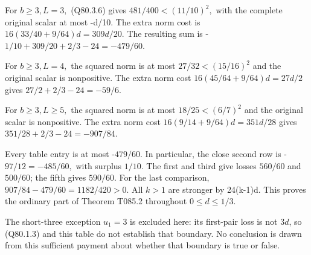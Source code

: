For \(b\ge 3,\allowbreak  L=3,\allowbreak \) (Q80.3.6) gives \(481/400<(11/10)^2,\allowbreak \) with the complete
original scalar at most -d/10. The extra norm cost is
\(16(33/40+9/64)d=309d/20.\) The resulting sum is
-\(1/10+309/20+2/3-24=-479/60.\)

For \(b\ge 3,\allowbreak  L=4,\allowbreak \) the squared norm is at most \(27/32<(15/16)^2\)
and the original scalar is nonpositive. The extra norm cost
\(16(45/64+9/64)d=27d/2\) gives \(27/2+2/3-24=-59/6.\)

For \(b\ge 3,\allowbreak  L\ge 5,\allowbreak \) the squared norm is at most \(18/25<(6/7)^2\)
and the original scalar is nonpositive. The extra norm cost
\(16(9/14+9/64)d=351d/28\) gives \(351/28+2/3-24=-907/84.\)

Every table entry is at most -\(479/60.\) In particular, the close
second row is -\(97/12=-485/60,\allowbreak \) with surplus \(1/10.\) The first and
third give losses \(560/60\) and \(500/60\); the fifth gives \(590/60.\)
For the last comparison, \(907/84-479/60=1182/420>0.\)
All \(k>1\) are stronger by 24(k-1)d. This proves the ordinary part
of Theorem T085.2 throughout \(0\le d\le 1/3.\)

The short-three exception \(u_1=3\) is excluded here: its first-pair loss is not \(3d\), so (Q80.1.3) and this table do
not establish that boundary. No conclusion is drawn from this
sufficient payment about whether that boundary is true or false.
